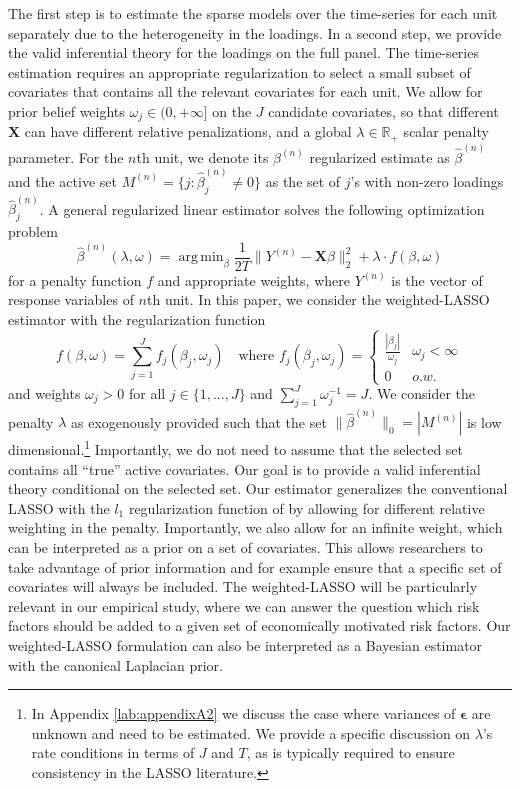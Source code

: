 \documentclass[11pt]{article}
\newcommand{\wh}{\text{where }}
\newcommand{\RR}{\mathbb{R}}
\DeclareMathOperator*{\argmin}{arg\,min}
\begin{document}
	The first step is to estimate the sparse models over the time-series for each unit separately due to the heterogeneity in the loadings. In a second step, we provide the valid inferential theory for the loadings on the full panel. The time-series estimation requires an appropriate regularization to select a small subset of covariates that contains all the relevant covariates for each unit. We allow for prior belief weights $\omega_j\in (0,+\infty]$ on the $J$ candidate covariates, so that different $\bm{X}$ can have different relative penalizations, and a global $\lambda \in\RR_+$ scalar penalty parameter. For the $n$th unit, we denote its $\beta^{(n)}$ regularized estimate as $\hat{\beta}^{(n)}$ and the active set $M^{(n)}=\{j:\hat{\beta}^{(n)}_j\neq 0\}$ as the set of $j$'s with non-zero loadings $\hat{\beta}^{(n)}_j$. A general regularized linear estimator solves the following optimization problem 
	\begin{equation}\label{4}
		\hat{\beta}^{(n)}(\lambda,\omega)=\argmin_{\beta} \frac{1}{2T}\|Y^{(n)}-\bm{X}\beta\|_2^2+\lambda\cdot f(\beta,\omega)
	\end{equation}
	for a penalty function $f$ and appropriate weights, where $Y^{(n)}$ is the vector of response variables of $n$th unit. In this paper, we consider the weighted-LASSO estimator with the regularization function 
	\begin{equation}
		f(\beta,\omega)=\sum_{j=1}^J f_j(\beta_j,\omega_j)
		\quad\wh
		f_j(\beta_j,\omega_j)=\begin{cases}
			\frac{|\beta_j|}{\omega_j}& \omega_j<\infty\\
			0& o.w.
		\end{cases}
	\end{equation}
	and weights $\omega_j>0$ for all $j\in \{1,...,J\}$ and $\sum_{j=1}^J\omega_j^{-1}=J$. We consider the penalty $\lambda$ as exogenously provided such that the set $\|\hat{\beta}^{(n)}\|_0=|M^{(n)}|$ is low dimensional.\footnote{In Appendix \ref{lab:appendixA2} we discuss the case where variances of $\bm{\epsilon}$ are unknown and need to be estimated. We provide a specific discussion on $\lambda$'s rate conditions in terms of $J$ and $T$, as is typically required to ensure consistency in the LASSO literature.} Importantly, we do not need to assume that the selected set contains all ``true'' active covariates. Our goal is to provide a valid inferential theory conditional on the selected set. Our estimator generalizes the conventional LASSO with the $l_1$ regularization function of \cite{2346178} by allowing for different relative weighting in the penalty. Importantly, we also allow for an infinite weight, which can be interpreted as a prior on a set of covariates. This allows researchers to take advantage of prior information and for example ensure that a specific set of covariates will always be included. The weighted-LASSO will be particularly relevant in our empirical study, where we can answer the question which risk factors should be added to a given set of economically motivated risk factors. Our weighted-LASSO formulation can also be interpreted as a Bayesian estimator with the canonical Laplacian prior.  
	
\end{document}
